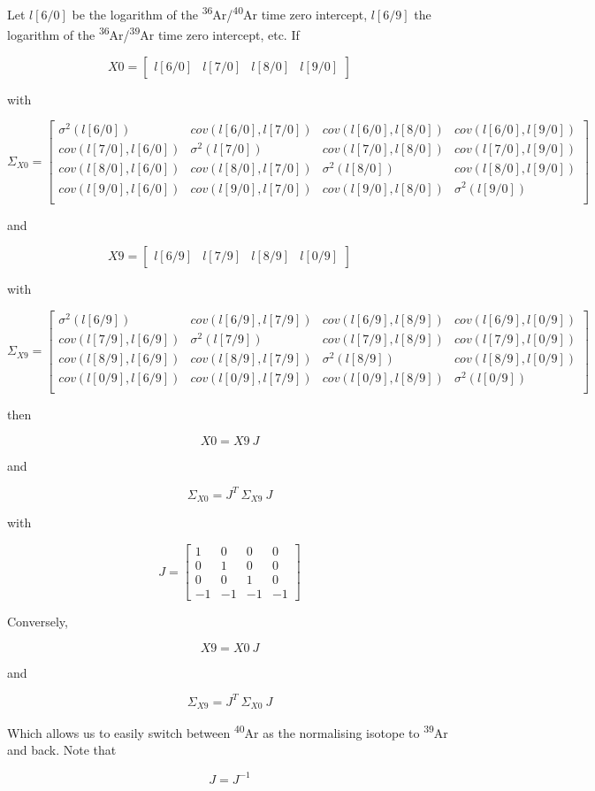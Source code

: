\documentclass{article}
\begin{document}
Let $l[6/0]$ be the logarithm of the
\textsuperscript{36}Ar/\textsuperscript{40}Ar time zero intercept,
$l[6/9]$ the logarithm of the
\textsuperscript{36}Ar/\textsuperscript{39}Ar time zero intercept,
etc. If

\[
X0 = \left[
  \begin{array}{cccc}
    l[6/0] & l[7/0] & l[8/0] & l[9/0]
  \end{array}
  \right]
\]

with

\[
\Sigma_{X0} = \left[
  \begin{array}{cccc}
    \sigma^2(l[6/0]) & cov(l[6/0],l[7/0]) & cov(l[6/0],l[8/0]) & cov(l[6/0],l[9/0]) \\
    cov(l[7/0],l[6/0]) & \sigma^2(l[7/0]) & cov(l[7/0],l[8/0]) & cov(l[7/0],l[9/0]) \\
    cov(l[8/0],l[6/0]) & cov(l[8/0],l[7/0]) & \sigma^2(l[8/0]) & cov(l[8/0],l[9/0]) \\
    cov(l[9/0],l[6/0]) & cov(l[9/0],l[7/0]) & cov(l[9/0],l[8/0]) & \sigma^2(l[9/0]) \\
  \end{array}
  \right]
\]

and

\[
X9 = \left[
  \begin{array}{cccc}
    l[6/9] & l[7/9] & l[8/9] & l[0/9]
  \end{array}
  \right]
\]

with

\[
\Sigma_{X9} = \left[
  \begin{array}{cccc}
    \sigma^2(l[6/9]) & cov(l[6/9],l[7/9]) & cov(l[6/9],l[8/9]) & cov(l[6/9],l[0/9]) \\
    cov(l[7/9],l[6/9]) & \sigma^2(l[7/9]) & cov(l[7/9],l[8/9]) & cov(l[7/9],l[0/9]) \\
    cov(l[8/9],l[6/9]) & cov(l[8/9],l[7/9]) & \sigma^2(l[8/9]) & cov(l[8/9],l[0/9]) \\
    cov(l[0/9],l[6/9]) & cov(l[0/9],l[7/9]) & cov(l[0/9],l[8/9]) & \sigma^2(l[0/9]) \\
  \end{array}
  \right]
\]

then

\[
X0 = X9 ~ J
\]

and

\[
\Sigma_{X0} = J^T ~ \Sigma_{X9} ~ J
\]

with

\[
J = \left[
  \begin{array}{rrrr}
    1 & 0 & 0 & 0 \\
    0 & 1 & 0 & 0 \\
    0 & 0 & 1 & 0 \\
    -1 & -1 & -1 & -1
  \end{array}
  \right]
\]

Conversely,

\[
X9 = X0 ~ J
\]

and

\[
\Sigma_{X9} = J^T ~ \Sigma_{X0} ~ J
\]

Which allows us to easily switch between \textsuperscript{40}Ar as the
normalising isotope to \textsuperscript{39}Ar and back. Note that

\[
J = J^{-1}
\]
\end{document}
